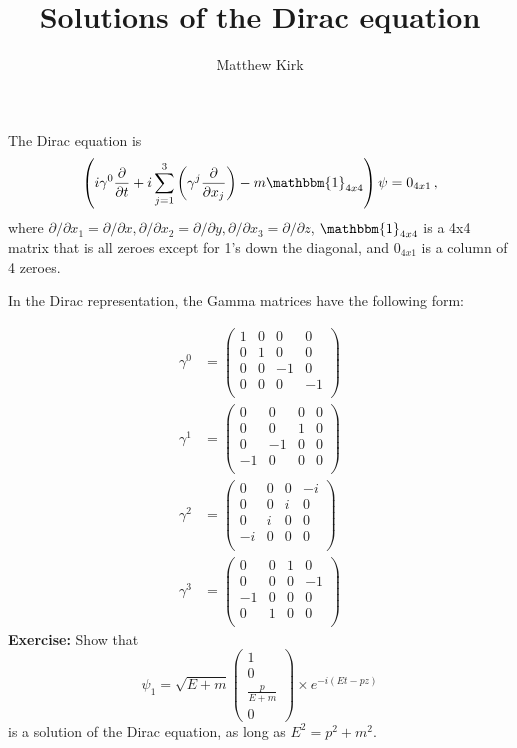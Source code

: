 \documentclass[a4paper,11pt]{article}
\author{Matthew Kirk}
\title{Solutions of the Dirac equation}
\numberwithin{equation}{section} %
\begin{document}
\maketitle


The Dirac equation is
\begin{equation}
\left( i \gamma^0 \frac{\partial}{\partial t} + i \sum_{j=1}^{3} \left( \gamma^j \frac{\partial}{\partial x_j} \right) - m \mathbbm{1}_{4x4} \right) \psi = 0_{4x1} \,,
\end{equation}
where $\partial / \partial x_1 = \partial / \partial x, \partial / \partial x_2 = \partial / \partial y, \partial / \partial x_3 = \partial / \partial z$, $\mathbbm{1}_{4x4}$ is a 4x4 matrix that is all zeroes except for 1's down the diagonal, and $0_{4x1}$ is a column of 4 zeroes.

In the Dirac representation, the Gamma matrices have the following form:

\begin{align}
\gamma^0 &= \begin{pmatrix}
 1 & 0 & 0 & 0 \\
 0 & 1 & 0 & 0 \\
 0 & 0 & -1 & 0 \\
 0 & 0 & 0 & -1 \\
\end{pmatrix}
\\
\gamma^1 &= \begin{pmatrix}
 0 & 0 & 0 & 0 \\
 0 & 0 & 1 & 0 \\
 0 & -1 & 0 & 0 \\
 -1 & 0 & 0 & 0 \\
\end{pmatrix}
\\
\gamma^2 &= \begin{pmatrix}
 0 & 0 & 0 & -i \\
 0 & 0 & i & 0 \\
 0 & i & 0 & 0 \\
 -i & 0 & 0 & 0 \\
\end{pmatrix}
\\
\gamma^3 &= \begin{pmatrix}
 0 & 0 & 1 & 0 \\
 0 & 0 & 0 & -1 \\
 -1 & 0 & 0 & 0 \\
 0 & 1 & 0 & 0 \\
\end{pmatrix}
\end{align}
\textbf{Exercise:} Show that
\begin{equation}
\psi_1 = \sqrt{E+m} \begin{pmatrix} 1 \\ 0 \\ \frac{p}{E+m} \\ 0 \end{pmatrix} \times e^{-i (E t - p z)}
\end{equation}
is a solution of the Dirac equation, as long as $E^2 = p^2 + m^2$.
\end{document}
